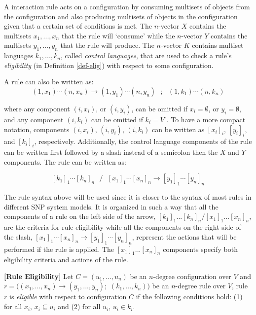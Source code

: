 \documentclass[a4paper]{article}
\theoremstyle{definition}
\newcommand{\ra}{\rightarrow}
\newcommand{\ts}{\text{ }}
\begin{document}
A interaction rule acts on a configuration by consuming multisets of objects from the configuration
and also producing multisets of objects in the configuration given that a certain set of conditions
is met. The $n$-vector $X$ contains the multisets $x_1,...,x_n$ that the rule will `consume' while
the $n$-vector $Y$ contains the multisets $y_1,...,y_n$ that the rule will produce. The $n$-vector 
$K$ contains multiset languages $k_1,...,k_n$, called \emph{control languages}, that are used to 
check a rule's \emph{eligibility} (in Definition \ref{def-elig}) with respect to some configuration.

A rule can also be written as:
$$(1,x_1)\cdots(n,x_n)\ra (1,y_1)\cdots(n,y_n)\ts;\ts (1,k_1)\cdots(n,k_n)$$

where any component $(i,x_i)$, or $(i,y_i)$, can be omitted if $x_i = \emptyset$, or 
$y_i = \emptyset$, and any component $(i,k_i)$ can be omitted if $k_i = V^{\circ}$. To have a more
compact notation, components $(i,x_i)$, $(i,y_i)$, $(i,k_i)$ can be written as ${[x_i]}_i$,
${[y_i]}_i$, and ${[k_i]}_i$, respectively. Additionally, the control language components of the 
rule can be written first followed by a slash instead of a semicolon then the $X$ and $Y$ 
components. The rule can be written as:

$${[k_1]}_1\cdots{[k_n]}_n\ts / \ts {[x_1]}_1\cdots {[x_n]}_n \ra {[y_1]}_1\cdots{[y_n]}_n$$

The rule syntax above will be used since it is closer to the syntax of most rules in different SNP 
system models. It is organized in such a way that all the components of a rule on the left side
of the arrow, ${[k_1]}_1 ... {[k_n]}_n/{[x_1]}_1...{[x_n]}_n$, are the criteria for rule eligibility
while all the components on the right side of the slash, 
${[x_1]}_1\cdots {[x_n]}_n \ra {[y_1]}_1\cdots{[y_n]}_n$, represent the actions that will be 
performed if the rule is applied. The ${[x_1]}_1...{[x_n]}_n$ components specify both eligibility
criteria and actions of the rule.


\label{def-elig} \textbf{[Rule Eligibility]} Let $C = (u_1,...,u_n)$ be an $n$-degree
configuration over $V$ and $r = ((x_1,...,x_n) \ra (y_1,...,y_n);$ $(k_1,...,k_n))$ be an $n$-degree
rule over $V$, rule $r$ is \emph{eligible} with respect to configuration $C$ if the following 
conditions hold: (1) for all $x_i$, $x_i \subseteq u_i$ and (2) for all $u_i$, $u_i \in k_i$.
\end{document}
